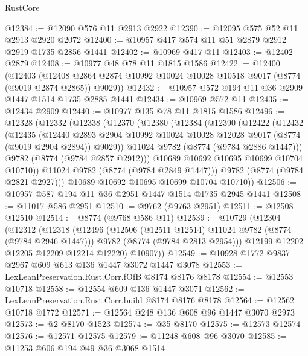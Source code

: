 \begin{lexlean}{RustCore}
\begin{coremodule}
@12384 := @12090 @576 @11 @2913 @2922
@12390 := @12095 @575 @52 @11 @2913 @2920 @2072
@12400 := @10957 @417 @574 @11 @51 @2879 @2912 @2919 @1735 @2856 @1441
@12402 := @10969 @417 @11
@12403 := @12402 @2879
@12408 := @10977 @48 @78 @11 @1815 @1586
@12422 := @12400
    (@12403
      (@12408 @2864 @2874 @10992 @10024 @10028 @10518 @9017 (@8774 (@9019 @2874 @2865)) @9029))
@12432 := @10957 @572 @194 @11 @36 @2909 @1447 @1514 @1735 @2885 @1441
@12434 := @10969 @572 @11
@12435 := @12434 @2909
@12440 := @10977 @135 @78 @11 @1815 @1586
@12496 := @12328
    (@12332
      (@12338
        (@12370
          (@12380
            (@12384
              (@12390
                (@12422
                  (@12432
                    (@12435
                      (@12440
                        @2893
                        @2904
                        @10992
                        @10024
                        @10028
                        @12028
                        @9017
                        (@8774 (@9019 @2904 @2894))
                        @9029))
                    @11024
                    @9782
                    (@8774 (@9784 @2886 @1447)))
                  @9782
                  (@8774 (@9784 @2857 @2912)))
                @10689
                @10692
                @10695
                @10699
                @10704
                @10710))
            @11024
            @9782
            (@8774 (@9784 @2849 @1447)))
          @9782
          (@8774 (@9784 @2821 @2927)))
        @10689
        @10692
        @10695
        @10699
        @10704
        @10710))
@12506 := @10957 @587 @194 @11 @36 @2951 @1447 @1514 @1735 @2945 @1441
@12508 := @11017 @586 @2951
@12510 := @9762 (@9763 @2951)
@12511 := @12508 @12510
@12514 := @8774 (@9768 @586 @11)
@12539 := @10729
    (@12304
      (@12312
        (@12318
          (@12496
            (@12506 (@12511 @12514) @11024 @9782 (@8774 (@9784 @2946 @1447)))
            @9782
            (@8774 (@9784 @2813 @2954)))
          @12199
          @12202
          @12205
          @12209
          @12214
          @12220)
        @10907))
@12549 := @10928 @1772 @9837 @2967 @609 @613 @136 @1447 @3072 @1447 @3078
@12553 := LexLeanPreservation.Rust.Corr.fOfB @8174 @8176 @8178
@12554 := @12553 @10718
@12558 := @12554 @609 @136 @1447 @3071
@12562 := LexLeanPreservation.Rust.Corr.build @8174 @8176 @8178
@12564 := @12562 @10718 @1772
@12571 := @12564 @248 @136 @608 @96 @1447 @3070 @2973
@12573 := @2 @8170 @1523
@12574 := @35 @8170
@12575 := @12573 @12574
@12576 := @12571 @12575
@12579 := @11248 @608 @96 @3070
@12585 := @11253 @606 @194 @49 @36 @3068 @1514

\end{coremodule}
\end{lexlean}

